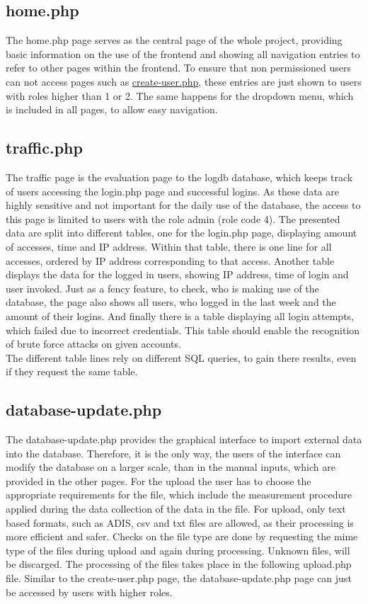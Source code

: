 
\subsection{home.php}

The home.php page serves as the central page of the whole project, providing basic information on the use of the frontend and showing all navigation entries to refer to other pages 
within the frontend. To ensure that non permissioned users can not access pages such as \hyperref[create-user.php]{create-user.php}, these entries are just shown to users with roles 
higher than 1 or 2. The same happens for the dropdown menu, which is included in all pages, to allow easy navigation. 

\subsection{traffic.php}
The traffic page is the evaluation page to the logdb database, which keeps track of users accessing the login.php page and successful logins. As these data are highly sensitive and 
not important for the daily use of the database, the access to this page is limited to users with the role admin (role code 4). The presented data are split into different tables, 
one for the login.php page, displaying amount of accesses, time and IP address. Within that table, there is one line for all accesses, ordered by IP address corresponding to that access. 
Another table displays the data for the logged in users, showing IP address, time of login and user invoked. Just as a fency feature, to check, who is making use of the database, the page also 
shows all users, who logged in the last week and the amount of their logins. And finally there is a table displaying all login attempts, which failed due to 
incorrect credentials. This table should enable the recognition of brute force attacks on given accounts.\\
The different table lines rely on different SQL queries, to gain there results, even if they request the same table.

\subsection{database-update.php}
The database-update.php provides the graphical interface to import external data into the database. Therefore, it is the only way, the users of the interface can modify the database 
on a larger scale, than in the manual inputs, which are provided in the other pages. For the upload the user has to choose the appropriate requirements for the file, which include the 
measurement procedure applied during the data collection of the data in the file. For upload, only text based formats, such as ADIS, csv and txt files are allowed, as their processing is more 
efficient and safer. Checks on the file type are done by requesting the mime type of the files during upload and again during processing. Unknown files, will be discarged. 
The processing of the files takes place in the following upload.php file. Similar to the create-user.php page, the database-update.php page can just be accessed by users with higher roles. 

